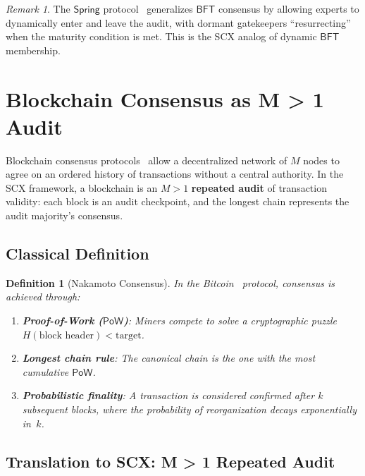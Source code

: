 \documentclass[12pt,a4paper]{article}
\newtheorem{definition}[theorem]{Definition}
\theoremstyle{remark}
\newtheorem{remark}[theorem]{Remark}
\newcommand{\SCX}{\textsf{SCX}}
\newcommand{\Spring}{\textsf{Spring}}
\newcommand{\BFT}{\textsf{BFT}}
\newcommand{\PoW}{\textsf{PoW}}
\begin{document}
\begin{remark}
\label{rem:bft_spring}
The $\Spring{}$ protocol~\cite{scx_spring} generalizes $\BFT$ consensus by allowing experts to dynamically enter and leave the audit, with dormant gatekeepers ``resurrecting'' when the maturity condition is met. This is the \SCX{} analog of dynamic $\BFT$ membership.
\end{remark}


\section{Blockchain Consensus as M > 1 Audit}
\label{sec:blockchain}

Blockchain consensus protocols~\cite{nakamoto2008bitcoin} allow a decentralized network of $M$ nodes to agree on an ordered history of transactions without a central authority. In the \SCX{} framework, a blockchain is an $M > 1$ \textbf{repeated audit} of transaction validity: each block is an audit checkpoint, and the longest chain represents the audit majority's consensus.

\subsection{Classical Definition}

\begin{definition}[Nakamoto Consensus]
\label{def:nakamoto}
In the Bitcoin~\cite{nakamoto2008bitcoin} protocol, consensus is achieved through:
\begin{enumerate}[leftmargin=*, label=(\roman*)]
  \item \textbf{Proof-of-Work ($\PoW$)}: Miners compete to solve a cryptographic puzzle~$H(\text{block header}) < \text{target}$.
  \item \textbf{Longest chain rule}: The canonical chain is the one with the most cumulative $\PoW$.
  \item \textbf{Probabilistic finality}: A transaction is considered confirmed after $k$ subsequent blocks, where the probability of reorganization decays exponentially in~$k$.
\end{enumerate}
\end{definition}

\subsection{Translation to SCX: M > 1 Repeated Audit}
\end{document}

